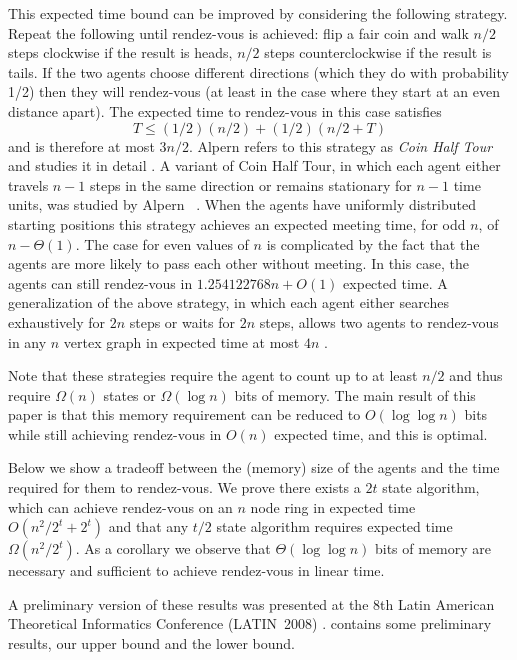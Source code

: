 \documentclass[acmtoalg]{acmtrans2m}
\begin{document}
This expected time bound can be improved by considering the following
strategy.  Repeat the following until rendez-vous is achieved: flip a
fair coin and walk $n/2$ steps clockwise if the result is heads, $n/2$
steps counterclockwise if the result is tails.  If the two agents choose
different directions (which they do with probability 1/2) then they will
rendez-vous (at least in the case where they start at an even distance
apart).  The expected time to rendez-vous in this case satisfies 
\[
  T \le (1/2)(n/2) + (1/2)(n/2+T)
\]
and is therefore at most $3n/2$.  Alpern refers to this strategy
as \emph{Coin Half Tour} and studies it in detail \cite{alpern95}.
A variant of Coin Half Tour, in which each agent either travels $n-1$
steps in the same direction or remains stationary for $n-1$ time units,
was studied by Alpern \etal\ \cite{abe99}.  When the agents have uniformly
distributed starting positions this strategy achieves an expected meeting
time, for odd $n$, of $n-\Theta(1)$. The case for even values of $n$
is complicated by the fact that the agents are more likely to pass each
other without meeting. In this case, the agents can still rendez-vous
in $1.254122768n + O(1)$ expected time.  A generalization of the above
strategy, in which each agent either searches exhaustively for $2n$
steps or waits for $2n$ steps, allows two agents to rendez-vous in any
$n$ vertex graph in expected time at most $4n$ \cite[Section~4]{abe99}.

Note that these strategies require the agent to count up to at least $n/2$
and thus require $\Omega(n)$ states or $\Omega(\log n)$ bits of memory.
The main result of this paper is that this memory requirement can be
reduced to $O(\log\log n)$ bits while still achieving rendez-vous in
$O(n)$ expected time, and this is optimal.

Below we show a tradeoff between the (memory) size of the agents and
the time required for them to rendez-vous. We prove there exists a $2t$
state algorithm,   which can achieve rendez-vous on an $n$ node ring in
expected time $O(n^2/2^{t} + 2^{t} )$ and that any $t/2$ state algorithm
requires expected time $\Omega( n^2/2^t )$.  As a corollary we observe
that $\Theta(\log \log n)$ bits of memory are necessary and sufficient
to achieve rendez-vous in linear time.

A preliminary version of these results was presented at the 8th
Latin American Theoretical Informatics Conference (LATIN~2008)
\cite{latin}.  contains some preliminary results,
 our upper bound and  the
lower bound.
\end{document}
